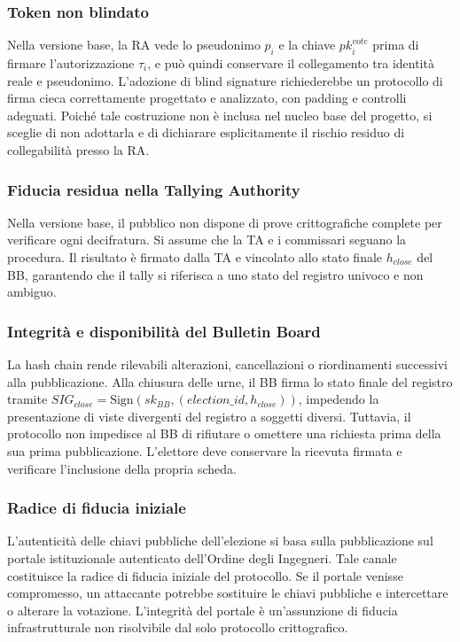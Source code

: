 \documentclass[12pt,a4paper]{article}
\newcommand{\pk}{\mathit{pk}}
\newcommand{\sk}{\mathit{sk}}
\begin{document}
\subsubsection*{Token non blindato}

Nella versione base, la RA vede lo pseudonimo $p_i$ e la chiave $\pk_i^{\mathit{vote}}$ prima di firmare l'autorizzazione $\tau_i$, e pu\`o quindi conservare il collegamento tra identit\`a reale e pseudonimo. L'adozione di blind signature richiederebbe un protocollo di firma cieca correttamente progettato e analizzato, con padding e controlli adeguati. Poiché tale costruzione non è inclusa nel nucleo base del progetto, si sceglie di non adottarla e di dichiarare esplicitamente il rischio residuo di collegabilità presso la RA.

\subsubsection*{Fiducia residua nella Tallying Authority}

Nella versione base, il pubblico non dispone di prove crittografiche complete per verificare ogni decifratura. Si assume che la TA e i commissari seguano la procedura. Il risultato \`e firmato dalla TA e vincolato allo stato finale $h_{\mathit{close}}$ del BB, garantendo che il tally si riferisca a uno stato del registro univoco e non ambiguo.

\subsubsection*{Integrit\`a e disponibilit\`a del Bulletin Board}

La hash chain rende rilevabili alterazioni, cancellazioni o riordinamenti successivi alla pubblicazione. Alla chiusura delle urne, il BB firma lo stato finale del registro tramite $\mathit{SIG}_{\mathit{close}} = \mathrm{Sign}(\sk_{\mathit{BB}}, (\mathit{election\_id}, h_{\mathit{close}}))$, impedendo la presentazione di viste divergenti del registro a soggetti diversi. Tuttavia, il protocollo non impedisce al BB di rifiutare o omettere una richiesta prima della sua prima pubblicazione. L'elettore deve conservare la ricevuta firmata e verificare l'inclusione della propria scheda.

\subsubsection*{Radice di fiducia iniziale}

L'autenticit\`a delle chiavi pubbliche dell'elezione si basa sulla pubblicazione sul portale istituzionale autenticato dell'Ordine degli Ingegneri. Tale canale costituisce la radice di fiducia iniziale del protocollo. Se il portale venisse compromesso, un attaccante potrebbe sostituire le chiavi pubbliche e intercettare o alterare la votazione. L'integrit\`a del portale \`e un'assunzione di fiducia infrastrutturale non risolvibile dal solo protocollo crittografico.
\end{document}
